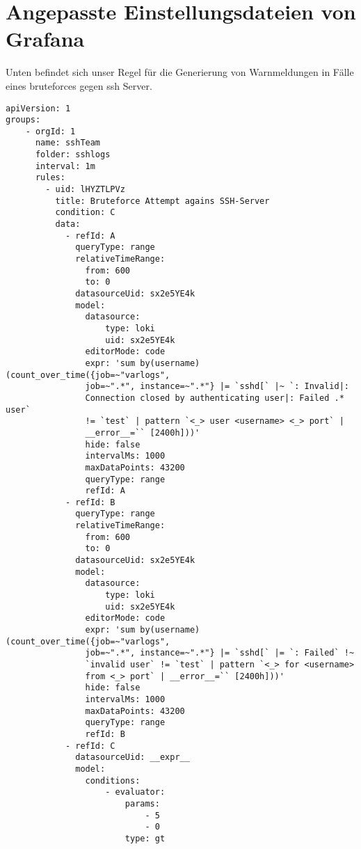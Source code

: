 \section{Angepasste Einstellungsdateien von Grafana}\label{appendix:Warnmedungskonfiguration}

Unten befindet sich unser Regel für die Generierung von Warnmeldungen in Fälle eines \gls{bruteforce}s gegen \gls{ssh} Server.

{
\begin{Verbatim}[frame=single]
apiVersion: 1
groups:
    - orgId: 1
      name: sshTeam
      folder: sshlogs
      interval: 1m
      rules:
        - uid: lHYZTLPVz
          title: Bruteforce Attempt agains SSH-Server
          condition: C
          data:
            - refId: A
              queryType: range
              relativeTimeRange:
                from: 600
                to: 0
              datasourceUid: sx2e5YE4k
              model:
                datasource:
                    type: loki
                    uid: sx2e5YE4k
                editorMode: code
                expr: 'sum by(username) (count_over_time({job=~"varlogs", 
                job=~".*", instance=~".*"} |= `sshd[` |~ `: Invalid|: 
                Connection closed by authenticating user|: Failed .* user` 
                != `test` | pattern `<_> user <username> <_> port` | 
                __error__=`` [2400h]))'
                hide: false
                intervalMs: 1000
                maxDataPoints: 43200
                queryType: range
                refId: A
            - refId: B
              queryType: range
              relativeTimeRange:
                from: 600
                to: 0
              datasourceUid: sx2e5YE4k
              model:
                datasource:
                    type: loki
                    uid: sx2e5YE4k
                editorMode: code
                expr: 'sum by(username) (count_over_time({job=~"varlogs", 
                job=~".*", instance=~".*"} |= `sshd[` |= `: Failed` !~ 
                `invalid user` != `test` | pattern `<_> for <username> 
                from <_> port` | __error__=`` [2400h]))'
                hide: false
                intervalMs: 1000
                maxDataPoints: 43200
                queryType: range
                refId: B
            - refId: C
              datasourceUid: __expr__
              model:
                conditions:
                    - evaluator:
                        params:
                            - 5
                            - 0
                        type: gt

\end{Verbatim}}
